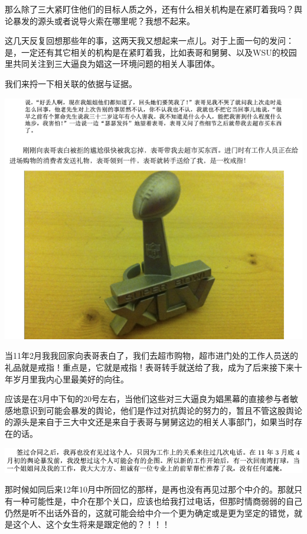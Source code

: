 \documentclass[9pt, b5paper]{article}
\begin{document}
那么除了三大紧盯住他们的目标人质之外，还有什么相关机构是在紧盯着我吗？舆论暴发的源头或者说导火索在哪里呢？我想不起来。 

这几天反复回想那些年的事，这两天我又想起来一点儿。对于上面一句的发问：是，一定还有其它相关的机构是在紧盯着我，比如表哥和舅舅、以及WSU的校园里共同关注到三大逼良为娼这一环境问题的相关人事团体。

我们来捋一下相关联的依据与证据。

\begin{center}
\includegraphics[width=.9\linewidth]{./pic/backups_plans_20210414_103205.png}
\end{center}

当11年2月我我回家向表哥表白了，我们去超市购物，超市进门处的工作人员送的礼品就是戒指！重点是，它就是戒指！表哥转手就送给了我，成为了后来接下来十年岁月里我内心里最美好的向往。

应该是在3月中下旬的20号左右，当他们这些对三大逼良为娼黑幕的直接参与者敏感地意识到可能会暴发的舆论，他们是作过对抗舆论的努力的，暂且不管这股舆论的源头是来自于三大中文还是来自于表哥与舅舅这边的相关人事部门，如果当时存在的话。

\begin{center}
\includegraphics[width=.9\linewidth]{./pic/readme_20210414_200125.png}
\end{center}

那时候如同后来12年10月中所回忆的那样，是再也没有再见过那个中介的。那就只有一种可能性是，中介在那个关口，应该也给我打过电话，但那时情商弱弱的自己仍然是听不出话外音的，这就可能会给中介一个更为确定或是更为坚定的错觉，就是这个人、这个女生将来是跟定他的？！！！
\end{document}

